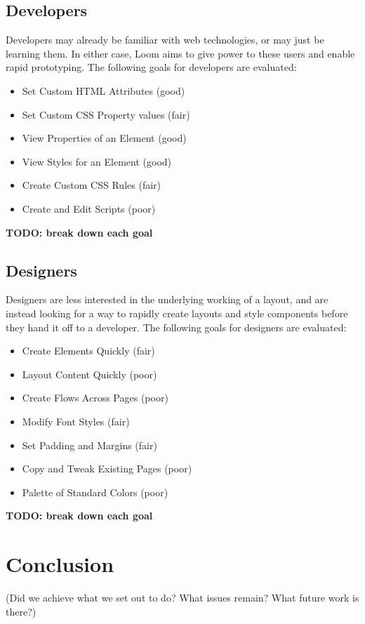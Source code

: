 \documentclass[conference, letterpaper]{IEEEtran}
\begin{document}
\subsection{Developers}
Developers may already be familiar with web technologies, or may just be learning them. In either case, Loom aims to give power to these users and enable rapid prototyping. The following goals for developers are evaluated:
\begin{itemize}
  \item Set Custom HTML Attributes (good)
  \item Set Custom CSS Property values (fair)
  \item View Properties of an Element (good)
  \item View Styles for an Element (good)
  \item Create Custom CSS Rules (fair)
  \item Create and Edit Scripts (poor)
\end{itemize}
\textbf{TODO: break down each goal}

\subsection{Designers}
Designers are less interested in the underlying working of a layout, and are instead looking for a way to rapidly create layouts and style components before they hand it off to a developer. The following goals for designers are evaluated:
\begin{itemize}
  \item Create Elements Quickly (fair)
  \item Layout Content Quickly (poor)
  \item Create Flows Across Pages (poor)
  \item Modify Font Styles (fair)
  \item Set Padding and Margins (fair)
  \item Copy and Tweak Existing Pages (poor)
  \item Palette of Standard Colors (poor)
\end{itemize}
\textbf{TODO: break down each goal}

\section{Conclusion}
(Did we achieve what we set out to do? What issues remain? What future work is there?)
\end{document}
